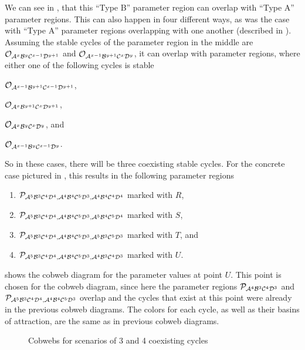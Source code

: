 We can see in , that this ``Type B'' parameter region can overlap with ``Type A'' parameter regions.
This can also happen in four different ways, as was the case with ``Type A'' parameter regions overlapping with one another (described in ).
Assuming the stable cycles of the parameter region in the middle are $\mathcal{O}_{\mathcal{A}^x\mathcal{B}^y\mathcal{C}^{x-1}\mathcal{D}^{y+1}}$ and $\mathcal{O}_{\mathcal{A}^{x-1}\mathcal{B}^{y+1}\mathcal{C}^x\mathcal{D}^y}$, it can overlap with parameter regions, where either one of the following cycles is stable
\begin{enumerate*}
    \item $\mathcal{O}_{\mathcal{A}^{x-1}\mathcal{B}^{y+1}\mathcal{C}^{x-1}\mathcal{D}^{y+1}}$,
    \item $\mathcal{O}_{\mathcal{A}^x\mathcal{B}^{y+1}\mathcal{C}^x\mathcal{D}^{y+1}}$,
    \item $\mathcal{O}_{\mathcal{A}^x\mathcal{B}^y\mathcal{C}^x\mathcal{D}^y}$, and
    \item $\mathcal{O}_{\mathcal{A}^{x-1}\mathcal{B}^y\mathcal{C}^{x-1}\mathcal{D}^y}$.
\end{enumerate*}
So in these cases, there will be three coexisting stable cycles.
For the concrete case pictured in , this results in the following parameter regions
\begin{enumerate}
    \item $\mathcal{P}_{\mathcal{A}^5\mathcal{B}^3\mathcal{C}^4\mathcal{D}^4, \mathcal{A}^4\mathcal{B}^4\mathcal{C}^5\mathcal{D}^3, \mathcal{A}^4\mathcal{B}^4\mathcal{C}^4\mathcal{D}^4}$ marked with $R$,
    \item $\mathcal{P}_{\mathcal{A}^5\mathcal{B}^3\mathcal{C}^4\mathcal{D}^4, \mathcal{A}^4\mathcal{B}^4\mathcal{C}^5\mathcal{D}^3, \mathcal{A}^5\mathcal{B}^4\mathcal{C}^5\mathcal{D}^4}$ marked with $S$,
    \item $\mathcal{P}_{\mathcal{A}^5\mathcal{B}^3\mathcal{C}^4\mathcal{D}^4, \mathcal{A}^4\mathcal{B}^4\mathcal{C}^5\mathcal{D}^3, \mathcal{A}^5\mathcal{B}^3\mathcal{C}^5\mathcal{D}^3}$ marked with $T$, and
    \item $\mathcal{P}_{\mathcal{A}^5\mathcal{B}^3\mathcal{C}^4\mathcal{D}^4, \mathcal{A}^4\mathcal{B}^4\mathcal{C}^5\mathcal{D}^3, \mathcal{A}^4\mathcal{B}^3\mathcal{C}^4\mathcal{D}^3}$ marked with $U$.
\end{enumerate}

 shows the cobweb diagram for the parameter values at point $U$.
This point is chosen for the cobweb diagram, since here the parameter regions $\mathcal{P}_{\mathcal{A}^4\mathcal{B}^3\mathcal{C}^4\mathcal{D}^3}$ and $\mathcal{P}_{\mathcal{A}^5\mathcal{B}^3\mathcal{C}^4\mathcal{D}^4, \mathcal{A}^4\mathcal{B}^4\mathcal{C}^5\mathcal{D}^3}$ overlap and the cycles that exist at this point were already in the previous cobweb diagrams.
The colors for each cycle, as well as their basins of attraction, are the same as in previous cobweb diagrams.

\begin{figure}
    \centering
    \caption{Cobwebs for scenarios of 3 and 4 coexisting cycles}
\end{figure}

